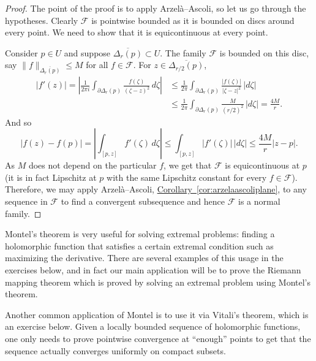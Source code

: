 \documentclass[12pt,openany]{book}
\newcommand{\sabs}[1]{\lvert {#1} \rvert}
\newcommand{\snorm}[1]{\lVert {#1} \rVert}
\newcommand{\abs}[1]{\left\lvert {#1} \right\rvert}
\newcommand{\sF}{{\mathscr{F}}}
\newcommand{\myquote}[1]{``#1''}
\theoremstyle{plain}
\theoremstyle{remark}
\theoremstyle{definition}
\theoremstyle{exercise}
\theoremstyle{example}
\newcommand{\corref}[1]{\hyperref[#1]{Corollary~\ref*{#1}}}
\begin{document}
\begin{proof}
The point of the proof is to apply Arzel\`a--Ascoli, so let us go through
the hypotheses.
Clearly $\sF$ is pointwise bounded as it is bounded on discs around
every point.
We need to show that it is equicontinuous at every point.

Consider $p \in U$ and suppose $\overline{\Delta_r(p)} \subset U$.
The family
$\sF$ is bounded on this disc,
say $\snorm{f}_{\overline{\Delta_r(p)}} \leq M$ for all $f \in \sF$.
For $z \in \overline{\Delta_{r/2}(p)}$,
\begin{equation*}
\begin{split}
\abs{f'(z)}
=
\abs{
\frac{1}{2\pi i}
\int_{\partial \Delta_r(p)}
\frac{f(\zeta)}{{(\zeta-z)}^2} \, d\zeta
}
& \leq
\frac{1}{2\pi}
\int_{\partial \Delta_r(p)}
\frac{\sabs{f(\zeta)}}{\sabs{\zeta-z}^2} \, \sabs{d\zeta}
\\
& \leq
\frac{1}{2\pi}
\int_{\partial \Delta_r(p)}
\frac{M}{{(r/2)}^2} \, \sabs{d\zeta}
=
\frac{4 M}{r}.
\end{split}
\end{equation*}
And so
\begin{equation*}
\abs{f(z)-f(p)}
=
\abs{
\int_{[p,z]} f'(\zeta) \, d\zeta
}
\leq
\int_{[p,z]} \abs{f'(\zeta)} \, \sabs{d\zeta}
\leq
\frac{4 M}{r} \sabs{z-p} .
\end{equation*}
As $M$ does not depend on the particular $f$, we get that $\sF$ is
equicontinuous at $p$ (it is in fact Lipschitz at $p$ with the same
Lipschitz constant for every $f \in \sF$).
Therefore, we may apply Arzel\`a--Ascoli, 
\corref{cor:arzelaascoliplane}, to any sequence in $\sF$
to find a convergent subsequence and hence $\sF$ is a normal family.
\end{proof}

Montel's theorem is very useful for solving extremal problems: 
finding a holomorphic function that satisfies a certain extremal condition
such as maximizing the derivative.  There are several examples of this
usage in the exercises below, and in fact our main application will be to
prove the Riemann mapping theorem which is proved by solving an extremal
problem using Montel's theorem.

Another common application of Montel is to use it via Vitali's theorem, which is
an exercise below.  Given a locally bounded sequence of holomorphic
functions, one only needs to prove pointwise convergence at \myquote{enough}
points to get that the sequence actually converges uniformly on compact subsets.
\end{document}
